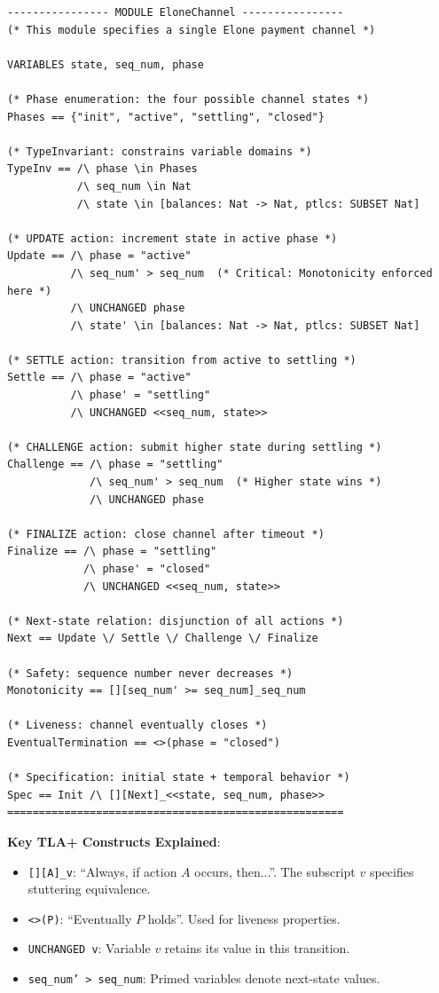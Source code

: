 \begin{lstlisting}[language=TLA, caption={TLA+ Specification of Channel Monotonicity}, label={lst:tla_spec}]
---------------- MODULE EloneChannel ----------------
(* This module specifies a single Elone payment channel *)

VARIABLES state, seq_num, phase

(* Phase enumeration: the four possible channel states *)
Phases == {"init", "active", "settling", "closed"}

(* TypeInvariant: constrains variable domains *)
TypeInv == /\ phase \in Phases
           /\ seq_num \in Nat
           /\ state \in [balances: Nat -> Nat, ptlcs: SUBSET Nat]

(* UPDATE action: increment state in active phase *)
Update == /\ phase = "active"
          /\ seq_num' > seq_num  (* Critical: Monotonicity enforced here *)
          /\ UNCHANGED phase
          /\ state' \in [balances: Nat -> Nat, ptlcs: SUBSET Nat]

(* SETTLE action: transition from active to settling *)
Settle == /\ phase = "active"
          /\ phase' = "settling"
          /\ UNCHANGED <<seq_num, state>>

(* CHALLENGE action: submit higher state during settling *)
Challenge == /\ phase = "settling"
             /\ seq_num' > seq_num  (* Higher state wins *)
             /\ UNCHANGED phase

(* FINALIZE action: close channel after timeout *)
Finalize == /\ phase = "settling"
            /\ phase' = "closed"
            /\ UNCHANGED <<seq_num, state>>

(* Next-state relation: disjunction of all actions *)
Next == Update \/ Settle \/ Challenge \/ Finalize

(* Safety: sequence number never decreases *)
Monotonicity == [][seq_num' >= seq_num]_seq_num

(* Liveness: channel eventually closes *)
EventualTermination == <>(phase = "closed")

(* Specification: initial state + temporal behavior *)
Spec == Init /\ [][Next]_<<state, seq_num, phase>>
=====================================================
\end{lstlisting}

\textbf{Key TLA+ Constructs Explained}:
\begin{itemize}
    \item \texttt{[][A]\_v}: ``Always, if action $A$ occurs, then...''. The subscript $v$ specifies stuttering equivalence.
    \item \texttt{<>(P)}: ``Eventually $P$ holds''. Used for liveness properties.
    \item \texttt{UNCHANGED v}: Variable $v$ retains its value in this transition.
    \item \texttt{seq\_num' > seq\_num}: Primed variables denote next-state values.
\end{itemize}


